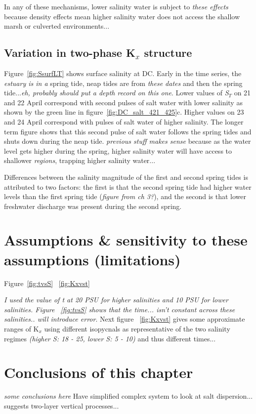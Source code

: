 In any of these mechanisms, lower salinity water is subject to \emph{these effects} because density effects mean higher salinity water does not access the shallow marsh or culverted environments... 

\subsection{Variation in two-phase K$_x$ structure}
Figure~\ref{fig:SsurfLT} shows surface salinity at DC. Early in the time series, the \emph{estuary is in a} spring tide, neap tides are from \emph{these dates} and then the spring tide...\emph{eh, probably should put a depth record on this one}. Lower values of \emph{S$_T$} on 21 and 22 April correspond with second pulses of salt water with lower salinity as shown by the green line in figure~\ref{fig:DC_salt_421_425}c. Higher values on 23 and 24 April correspond with pulses of salt water of higher salinity. The longer term figure shows that this second pulse of salt water follows the spring tides and shuts down during the neap tide. \emph{previous stuff makes sense} because as the water level gets higher during the spring, higher salinity water will have access to shallower \emph{regions}, trapping higher salinity water... 

Differences between the salinity magnitude of the first and second spring tides is attributed to two factors: the first is that the second spring tide had higher water levels than the first spring tide (\emph{figure from ch 3?}), and the second is that lower freshwater discharge was present during the second spring. 

\section{Assumptions \& sensitivity to these assumptions (limitations)}

Figure~\ref{fig:tvsS} ~\ref{fig:Kxvst}

\emph{I used the value of t at 20 PSU for higher salinities and 10 PSU for lower salinities.  Figure ~\ref{fig:tvsS} shows that the time... isn't constant across these salinities.. will introduce error}.  Next figure ~\ref{fig:Kxvst} gives some approximate ranges of K$_x$ using different isopycnals as representative of the two salinity regimes \emph{(higher S: 18 - 25, lower S: 5 - 10)} and thus different times... 




\section{Conclusions of this chapter}
\emph{some conclusions here}
Have simplified complex system to look at salt dispersion... suggests two-layer vertical processes... 

